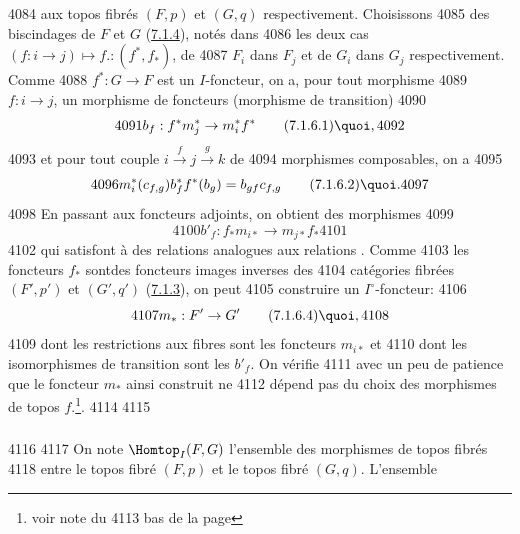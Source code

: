  4084	aux topos fibrés $(F, p)$ et $(G, q)$ respectivement. Choisissons
  4085	des biscindages de $F$ et $G$ (\hyperref[VI.subsubsec7.1.4]{7.1.4}), notés dans
  4086	les deux cas $(f : i \to j) \mapsto f. : (f^{\ast}, f_{\ast})$, de
  4087	$F_i$ dans $F_j$ et de $G_i$ dans $G_j$ respectivement. Comme
  4088	$f^{\ast} : G \to F$ est un $I$-foncteur, on a, pour tout morphisme
  4089	$f : i \to j$, un morphisme de foncteurs (morphisme de transition)
  4090	\begin{equation*}
  4091	b_f : f^{\ast}m^{\ast}_j \to m^{\ast}_i f^{\ast}\tag{7.1.6.1}{\quoi},
  4092	\end{equation*}
  4093	et pour tout couple $i \xrightarrow{f} j \xrightarrow{g} k$ de
  4094	morphismes composables, on a
  4095	\begin{equation*}
  4096	m^{\ast}_i (c_{f, g}) b^{\ast}_f f^{\ast} (b_g) = b_{gf} c_{f, g}\tag{7.1.6.2}{\quoi}.
  4097	\end{equation*}
  4098	En passant aux foncteurs adjoints, on obtient des morphismes
  4099	\begin{equation*}
  4100	b'_f : f_{\ast}m_{i \ast} \to m_{j\ast} f_{\ast}\tag{7.1.6.3}
  4101	\end{equation*}
  4102	qui satisfont à des relations analogues aux relations . Comme
  4103	les foncteurs $f_{\ast}$ sont\pageoriginale des foncteurs images inverses des
  4104	catégories fibrées $(F', p')$ et $(G', q')$ (\hyperref[VI.subsubsec7.1.3]{7.1.3}), on peut
  4105	construire un $I^{\circ}$-foncteur:
  4106	\begin{equation*}
  4107	m_{\ast} : F'\to G'\tag{7.1.6.4}{\quoi},
  4108	\end{equation*}
  4109	dont les restrictions aux fibres sont les foncteurs $m_{i\ast}$ et
  4110	dont les isomorphismes de transition sont les $b'_f$. On vérifie
  4111	avec un peu de patience que le foncteur $m_{\ast}$ ainsi construit ne
  4112	dépend pas du choix des morphismes de topos $f$.\footnote{voir note du
  4113	  bas de la page }.
  4114	
  4115	\subsubsection{}
  4116	
  4117	On note $\Homtop_I (F, G)$ l'ensemble des morphismes de topos fibrés
  4118	entre le topos fibré $(F, p)$ et le topos fibré $(G, q)$. L'ensemble
